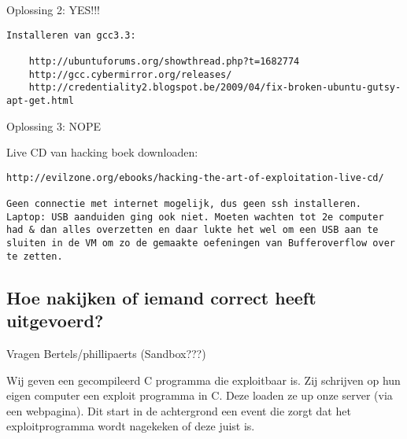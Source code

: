 Oplossing 2: YES!!!

\begin{lstlisting}
Installeren van gcc3.3:

    http://ubuntuforums.org/showthread.php?t=1682774
    http://gcc.cybermirror.org/releases/
    http://credentiality2.blogspot.be/2009/04/fix-broken-ubuntu-gutsy-apt-get.html
\end{lstlisting}

Oplossing 3: NOPE

Live CD van hacking boek downloaden:

\begin{lstlisting}
http://evilzone.org/ebooks/hacking-the-art-of-exploitation-live-cd/

Geen connectie met internet mogelijk, dus geen ssh installeren.
Laptop: USB aanduiden ging ook niet. Moeten wachten tot 2e computer had & dan alles overzetten en daar lukte het wel om een USB aan te sluiten in de VM om zo de gemaakte oefeningen van Bufferoverflow over te zetten.
\end{lstlisting}

\subsection{Hoe nakijken of iemand correct heeft uitgevoerd?}
Vragen Bertels/phillipaerts (Sandbox???)

Wij geven een gecompileerd C programma die exploitbaar is. Zij schrijven op hun eigen computer een exploit programma in C. Deze loaden ze up onze server (via een webpagina). Dit start in de achtergrond een event die zorgt dat het exploitprogramma wordt nagekeken of deze juist is.

